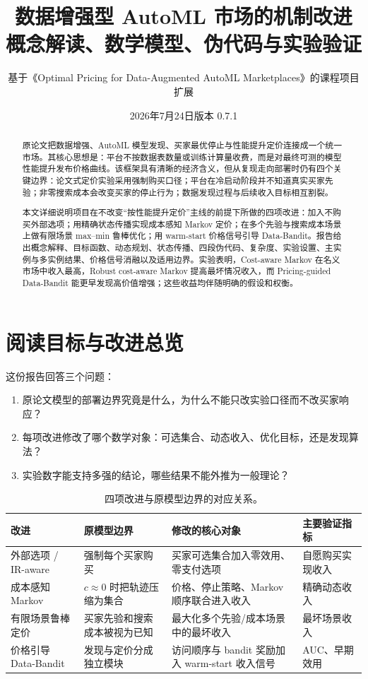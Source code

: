 \documentclass[11pt,a4paper]{ctexart}
\title{\textbf{数据增强型 AutoML 市场的机制改进}\\
\large 概念解读、数学模型、伪代码与实验验证}
\author{基于《Optimal Pricing for Data-Augmented AutoML Marketplaces》的课程项目扩展}
\date{2026年7月24日\quad 版本 0.7.1}
\begin{document}
\maketitle

\begin{abstract}
原论文把数据增强、AutoML 模型发现、买家最优停止与性能提升定价连接成一个统一市场。其核心思想是：平台不按数据表数量或训练计算量收费，而是对最终可测的模型性能提升发布价格曲线。该框架具有清晰的经济含义，但从复现走向部署时仍有四个关键边界：论文式定价实验采用强制购买口径；平台在冷启动阶段并不知道真实买家先验；非零搜索成本会改变买家的停止行为；数据发现过程与后续收入目标相互割裂。

本文详细说明项目在不改变“按性能提升定价”主线的前提下所做的四项改进：加入不购买外部选项；用精确状态传播实现成本感知 Markov 定价；在多个先验与搜索成本场景上做有限场景 max--min 鲁棒优化；用 warm-start 价格信号引导 Data-Bandit。报告给出概念解释、目标函数、动态规划、状态传播、四段伪代码、复杂度、实验设置、主实例与多实例结果、价格信号消融以及适用边界。实验表明，Cost-aware Markov 在名义市场中收入最高，Robust cost-aware Markov 提高最坏情况收入，而 Pricing-guided Data-Bandit 能更早发现高价值增强；这些收益均伴随明确的假设和权衡。
\end{abstract}

\tableofcontents
\newpage

\section{阅读目标与改进总览}

这份报告回答三个问题：

\begin{enumerate}
  \item 原论文模型的部署边界究竟是什么，为什么不能只改实验口径而不改买家响应？
  \item 每项改进修改了哪个数学对象：可选集合、动态收入、优化目标，还是发现算法？
  \item 实验数字能支持多强的结论，哪些结果不能外推为一般理论？
\end{enumerate}

\begin{table}[H]
\centering
\small
\caption{四项改进与原模型边界的对应关系。}
\begin{tabularx}{\textwidth}{p{2.7cm}p{3.0cm}X p{2.7cm}}
\toprule
改进 & 原模型边界 & 修改的核心对象 & 主要验证指标\\
\midrule
外部选项 / IR-aware &
强制每个买家购买 &
买家可选集合加入零效用、零支付选项 &
自愿购买实现收入\\
\addlinespace
成本感知 Markov &
$c\approx0$ 时把轨迹压缩为集合 &
价格、停止策略、Markov 顺序联合进入收入 &
精确动态收入\\
\addlinespace
有限场景鲁棒定价 &
买家先验和搜索成本被视为已知 &
最大化多个先验/成本场景中的最坏收入 &
最坏场景收入\\
\addlinespace
价格引导 Data-Bandit &
发现与定价分成独立模块 &
访问顺序与 bandit 奖励加入 warm-start 收入信号 &
AUC、早期效用\\
\bottomrule
\end{tabularx}
\end{table}
\end{document}
